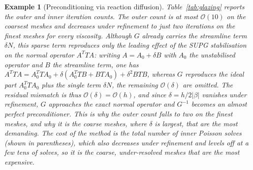 \documentclass[hidelinks,onefignum,onetabnum]{siamart220329}
\newtheorem{example}{Example}
\begin{document}
\begin{example}[Preconditioning via reaction diffusion]
{    Table~\ref{tab:glazing} reports the outer and inner iteration counts. The outer count is at most $\mathcal{O}(10)$ on the coarsest meshes and \emph{decreases} under refinement to just two iterations on the finest meshes for every viscosity. Although $G$ already carries the streamline term $\delta N$, this sparse term reproduces only the leading effect of the SUPG stabilisation on the normal operator $A^{T}TA$: writing $A = A_0 + \delta B$ with $A_0$ the unstabilised operator and $B$ the streamline term, one has $A^{T}TA = A_0^{T}TA_0 + \delta(A_0^{T}TB + BTA_0) + \delta^2 BTB$, whereas $G$ reproduces the ideal part $A_0^{T}TA_0$ plus the single term $\delta N$, the remaining $\mathcal{O}(\delta)$ are omitted. The residual mismatch is thus $\mathcal{O}(\delta) = \mathcal{O}(h)$, and since $\delta = h/2|\beta|$ vanishes under refinement, $G$ approaches the exact normal operator and $G^{-1}$ becomes an almost perfect preconditioner. This is why the outer count falls to two on the finest meshes, and why it is the coarse meshes, where $\delta$ is largest, that are the most demanding. The cost of the method is the total number of inner Poisson solves (shown in parentheses), which also decreases under refinement and levels off at a few tens of solves, so it is the coarse, under-resolved meshes that are the most expensive.}


\end{example}
\end{document}
